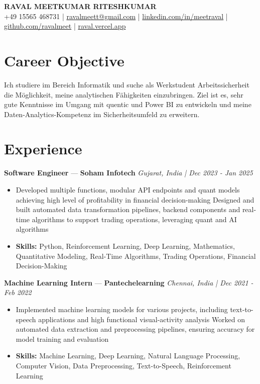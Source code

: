 \documentclass[a4paper,10pt]{article}
\begin{document}
\begin{center}
  {\Large\bfseries RAVAL MEETKUMAR RITESHKUMAR}\\[2pt]
  {\small +49 15565 468731 \;|\; \href{mailto:ravalmeett@gmail.com}{ravalmeett@gmail.com} \;|\; \href{https://www.linkedin.com/in/meetraval/}{linkedin.com/in/meetraval} \;|\; \href{https://github.com/ravalmeet}{github.com/ravalmeet} \;|\; \href{https://raval.vercel.app/}{raval.vercel.app}}
\end{center}
\vspace{-3pt}

\section*{Career Objective}
Ich studiere im Bereich Informatik und suche als Werkstudent Arbeitssicherheit die Möglichkeit, meine analytischen Fähigkeiten einzubringen. Ziel ist es, sehr gute Kenntnisse im Umgang mit quentic und Power BI zu entwickeln und meine Daten-Analytics-Kompetenz im Sicherheitsumfeld zu erweitern.\par

\section*{Experience}
\textbf{Software Engineer} — \textbf{Soham Infotech} \hfill \textit{Gujarat, India \;|\; Dec 2023 - Jan 2025}\par
\vspace{1pt}
\begin{itemize}
  \item Developed multiple functions, modular API endpoints and quant models achieving high level of profitability in financial decision-making Designed and built automated data transformation pipelines, backend components and real-time algorithms to support trading operations, leveraging quant and AI algorithms
  \item \textbf{Skills:} Python, Reinforcement Learning, Deep Learning, Mathematics, Quantitative Modeling, Real-Time Algorithms, Trading Operations, Financial Decision-Making
\end{itemize}
\vspace{3pt}
\textbf{Machine Learning Intern} — \textbf{Pantechelearning} \hfill \textit{Chennai, India \;|\; Dec 2021 - Feb 2022}\par
\vspace{1pt}
\begin{itemize}
  \item Implemented machine learning models for various projects, including text-to-speech applications and high functional visual-activity analysis Worked on automated data extraction and preprocessing pipelines, ensuring accuracy for model training and evaluation
  \item \textbf{Skills:} Machine Learning, Deep Learning, Natural Language Processing, Computer Vision, Data Preprocessing, Text-to-Speech, Reinforcement Learning
\end{itemize}
\end{document}
